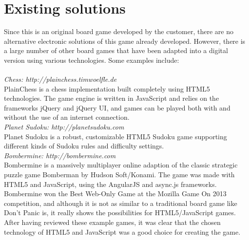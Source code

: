 \noindent \section{Existing solutions}
Since this is an original board game developed by the customer, there are no alternative electronic solutions of this game already developed. However, there is a large number of other board games that have been adapted into a digital version using various technologies. Some examples include:\\
\\
\noindent \emph{Chess: http://plainchess.timwoelfle.de}\\
PlainChess is a chess implementation built completely using HTML5 technologies. The game engine is written in JavaScript and relies on the frameworks jQuery and jQuery UI, and games can be played both with and without the use of an internet connection.\\

\noindent \emph{Planet Sudoku: http://planetsudoku.com}\\
Planet Sudoku is a robust, customizable HTML5 Sudoku game supporting different kinds of Sudoku rules and difficulty settings.\\

\noindent \emph{Bombermine: http://bombermine.com}\\
Bombermine is a massively multiplayer online adaption of the classic strategic puzzle game Bomberman by Hudson Soft/Konami. The game was made with HTML5 and JavaScript, using the AngularJS and async.js frameworks. Bombermine won the Best Web-Only Game at the Mozilla Game On 2013 competition, and although it is not as similar to a traditional board game like Don’t Panic is, it really shows the possibilities for HTML5/JavaScript games.\\

After having reviewed these example games, it was clear that the chosen technology of HTML5 and JavaScript was a good choice for creating the game.\\

